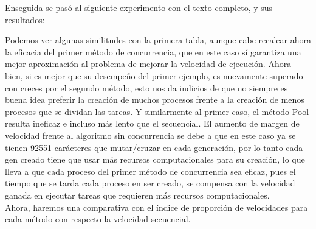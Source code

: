 \documentclass[a4paper,twocolumn,10pt]{article}
\begin{document}
Enseguida se pasó al siguiente experimento con el texto completo, y sus resultados:
\begin{table}[h]
\caption{Muestra los resultados para Lorem Ipsum Completo, con 92551 carácteres y 500 iteraciones cada uno.}
\end{table}
Podemos ver algunas similitudes con la primera tabla, aunque cabe recalcar ahora la eficacia del primer método de concurrencia, que en este caso sí garantiza una mejor aproximación al problema de mejorar la velocidad de ejecución. Ahora bien, si es mejor que su desempeño del primer ejemplo, es nuevamente superado con creces por el segundo método, esto nos da indicios de que no siempre es buena idea preferir la creación de muchos procesos frente a la creación de menos procesos que se dividan las tareas. Y similarmente al primer caso, el método Pool resulta ineficaz e incluso más lento que el secuencial. El aumento de margen de velocidad frente al algoritmo sin concurrencia se debe a que en este caso ya se tienen 92551 carácteres que mutar/cruzar en cada generación, por lo tanto cada gen creado tiene que usar más recursos computacionales para su creación, lo que lleva a que cada proceso del primer método de concurrencia sea eficaz, pues el tiempo que se tarda cada proceso en ser creado, se compensa con la velocidad ganada en ejecutar tareas que requieren más recursos computacionales.\\
Ahora, haremos una comparativa con el índice de proporción de velocidades para cada método con respecto la velocidad secuencial.
\end{document}
